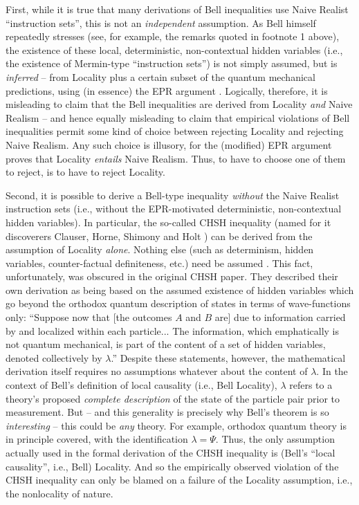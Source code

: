 \documentclass[12pt]{article}
\begin{document}
First, while it is true that many derivations of Bell inequalities use
Naive Realist ``instruction sets'', this is not an \emph{independent}
assumption.  As Bell himself repeatedly stresses (see, for example,
the remarks quoted in footnote 1 above), the existence of
these local, deterministic, non-contextual hidden variables (i.e., the
existence of Mermin-type ``instruction sets'') is not simply assumed,
but is \emph{inferred} -- from Locality plus a certain subset of the
quantum mechanical predictions, using (in essence) the EPR argument \cite{nonlocchar}. 
Logically, therefore, it is misleading
to claim that the Bell inequalities are derived from 
Locality \emph{and} Naive Realism -- and hence equally misleading
to claim that empirical violations of Bell inequalities
permit some kind of choice between rejecting Locality and rejecting
Naive Realism.  Any such choice is illusory, for the (modified) EPR
argument proves that Locality \emph{entails} Naive Realism.  Thus, to 
have to choose one of them to reject, is to have to reject Locality.

Second, it is possible to derive a Bell-type inequality \emph{without}
the Naive Realist instruction sets (i.e., without the EPR-motivated 
deterministic, non-contextual hidden variables).  In particular, the
so-called CHSH inequality (named for it discoverers Clauser, Horne, 
Shimony and Holt \cite{chsh}) can be derived from the assumption of Locality
\emph{alone}.  Nothing else (such as determinism, hidden variables,
counter-factual definiteness, etc.) need be assumed \cite{cfm}.
This fact,
unfortunately, was obscured in the original CHSH paper.  They
described their own derivation as being based on the 
assumed existence of hidden variables which go beyond the orthodox
quantum description of states in terms of wave-functions only:
``Suppose now that [the outcomes $A$ and $B$ are] 
due to information carried by and localized within each
particle... The information, which emphatically is not quantum
mechanical, is part of the content of a set of hidden variables, denoted
collectively by $\lambda$.''  Despite these statements, however, the
mathematical derivation itself requires no assumptions whatever about
the content of $\lambda$.  In the context of Bell's definition of
local causality (i.e., Bell Locality), $\lambda$ refers to a theory's
proposed \emph{complete description} of the state of the particle pair
prior to measurement.  But -- and this generality is precisely why
Bell's theorem is so \emph{interesting} -- this could be \emph{any}
theory.  For example, orthodox quantum theory is in principle covered,
with the identification $\lambda = \Psi$.  Thus, the only assumption
actually used in the formal derivation of the CHSH inequality is
(Bell's ``local causality'', i.e., Bell) Locality.  And so the
empirically observed violation of the CHSH inequality can only be
blamed on a failure of the Locality assumption, i.e., the nonlocality
of nature.  
\end{document}
